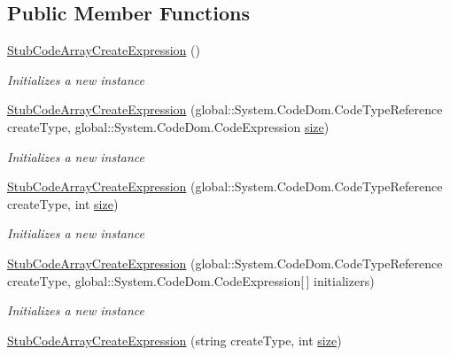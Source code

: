\subsection*{Public Member Functions}
\begin{DoxyCompactItemize}
\item 
\hyperlink{class_system_1_1_code_dom_1_1_fakes_1_1_stub_code_array_create_expression_ae9df208f9571df0e104ca4ad0d4bfb3c}{Stub\-Code\-Array\-Create\-Expression} ()
\begin{DoxyCompactList}\small\item\em Initializes a new instance\end{DoxyCompactList}\item 
\hyperlink{class_system_1_1_code_dom_1_1_fakes_1_1_stub_code_array_create_expression_ab848e1c2ac17da1f8d51314eedce1bde}{Stub\-Code\-Array\-Create\-Expression} (global\-::\-System.\-Code\-Dom.\-Code\-Type\-Reference create\-Type, global\-::\-System.\-Code\-Dom.\-Code\-Expression \hyperlink{jquery-1_810_82_8js_afa6806c6ee5e63d5177f1dcc082ba6bc}{size})
\begin{DoxyCompactList}\small\item\em Initializes a new instance\end{DoxyCompactList}\item 
\hyperlink{class_system_1_1_code_dom_1_1_fakes_1_1_stub_code_array_create_expression_ae60f44db8a6f195d5f422b03b035bf01}{Stub\-Code\-Array\-Create\-Expression} (global\-::\-System.\-Code\-Dom.\-Code\-Type\-Reference create\-Type, int \hyperlink{jquery-1_810_82_8js_afa6806c6ee5e63d5177f1dcc082ba6bc}{size})
\begin{DoxyCompactList}\small\item\em Initializes a new instance\end{DoxyCompactList}\item 
\hyperlink{class_system_1_1_code_dom_1_1_fakes_1_1_stub_code_array_create_expression_aeadd5d96016f72779d5a7c2e5b8b5da2}{Stub\-Code\-Array\-Create\-Expression} (global\-::\-System.\-Code\-Dom.\-Code\-Type\-Reference create\-Type, global\-::\-System.\-Code\-Dom.\-Code\-Expression\mbox{[}$\,$\mbox{]} initializers)
\begin{DoxyCompactList}\small\item\em Initializes a new instance\end{DoxyCompactList}\item 
\hyperlink{class_system_1_1_code_dom_1_1_fakes_1_1_stub_code_array_create_expression_a870eca358797de953d08527ceeafa4aa}{Stub\-Code\-Array\-Create\-Expression} (string create\-Type, int \hyperlink{jquery-1_810_82_8js_afa6806c6ee5e63d5177f1dcc082ba6bc}{size})

\end{DoxyCompactItemize}
